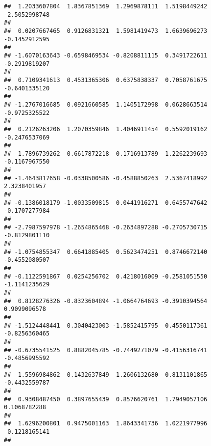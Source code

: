 \documentclass[]{article}
\begin{document}
\begin{verbatim}
##  1.2033607804  1.8367851369  1.2969878111  1.5198449242 -2.5052998748 
##                                                                       
##  0.0207667465  0.9126831321  1.5981419473  1.6639696273 -0.1452912595 
##                                                                       
## -1.6070163643 -0.6598469534 -0.8208811115  0.3491722611 -0.2919819207 
##                                                                       
##  0.7109341613  0.4531365306  0.6375838337  0.7058761675 -0.6401335120 
##                                                                       
## -1.2767016685  0.0921660585  1.1405172998  0.0628663514 -0.9725325522 
##                                                                       
##  0.2126263206  1.2070359846  1.4046911454  0.5592019162 -0.2476537069 
##                                                                       
##  1.7896739262  0.6617872218  0.1716913789  1.2262239693 -0.1167967550 
##                                                                       
## -1.4643817658 -0.0338500586 -0.4588850263  2.5367418992  2.3238401957 
##                                                                       
## -0.1386018179 -1.0033509815  0.0441916271  0.6455747642 -0.1707277984 
##                                                                       
## -2.7987597978 -1.2654865468 -0.2634897288 -0.2705730715 -0.8129801110 
##                                                                       
## -1.0754855347  0.6641885405  0.5623474251  0.8746672140 -0.4552080507 
##                                                                       
## -0.1122591867  0.0254256702  0.4218016009 -0.2581051550 -1.1141235629 
##                                                                       
##  0.8128276326 -0.8323604894 -1.0664764693 -0.3910394564  0.9099096578 
##                                                                       
## -1.5124448441  0.3040423003 -1.5852415795  0.4550117361 -0.8256360465 
##                                                                       
## -0.6735541525  0.8882045785 -0.7449271079 -0.4156316741 -0.4856995592 
##                                                                       
##  1.5596984862  0.1432637849  1.2606132680  0.8131101865 -0.4432559787 
##                                                                       
##  0.9308487450  0.3897655439  0.8576620761  1.7949057106  0.1068782288 
##                                                                       
##  1.6296200801  0.9475001163  1.8643341736  1.0221977996 -0.1218165141 
##                                                                       

\end{verbatim}
\end{document}
